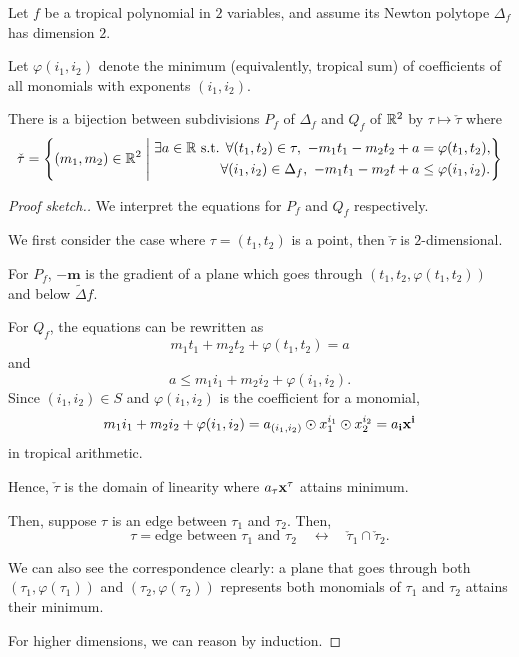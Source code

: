 \documentclass[../../main.tex]{subfiles}
\begin{document}
\begin{prop}
    Let $f$ be a tropical polynomial in $2$ variables, and assume its Newton polytope $\Delta_f$ has dimension $2$.

    Let $\varphi(i_1,i_2)$ denote the minimum (equivalently, tropical sum) of coefficients of all monomials with exponents $(i_1,i_2)$.
    
    There is a bijection between subdivisions $P_f$ of $\Delta_f$ and $Q_f$ of $\mathbb{R}^2$ by $\tau \mapsto \check\tau$ where 
    \[
    \check\tau = \left\{(m_1,m_2) \in \mathbb{R}^2 \Biggm|
    \begin{aligned}
        \exists a \in \mathbb{R} \text{ s.t. } 
        \forall (t_1,t_2) \in \tau,~-m_1t_1-m_2t_2+a & =\varphi(t_1,t_2), \\
        \forall (i_1,i_2) \in \Delta_f,~-m_1t_1-m_2t+a &\le \varphi(i_1,i_2).
    \end{aligned}
    \right\}
    \]
\end{prop}

\begin{proof}[Proof sketch.]
    We interpret the equations for $P_f$ and $Q_f$ respectively.

    We first consider the case where $\tau=(t_1,t_2)$ is a point, then $\check\tau$ is $2$-dimensional.
    
    For $P_f$, $-\mathbf m$ is the gradient of a plane which goes through $(t_1,t_2,\varphi(t_1,t_2))$ and below $\tilde\Delta f.$ 

    For $Q_f$, the equations can be rewritten as
    \[m_1t_1+m_2t_2+\varphi(t_1,t_2)=a\]
    and
    \[a \le m_1i_1+m_2i_2+\varphi(i_1,i_2).\]
    Since $(i_1,i_2) \in S$ and $\varphi(i_1,i_2)$ is the coefficient for a monomial,
    \[m_1i_1+m_2i_2+\varphi(i_1,i_2)=a_{(i_1,i_2)}\odot x_1^{i_1}\odot x_2^{i_2}=a_{\mathbf{i}} \mathbf{x}^{\mathbf{i}}\]
    in tropical arithmetic.

    Hence, $\check\tau$ is the domain of linearity where $a_\tau\mathbf{x}^\tau$ attains minimum. 

    Then, suppose $\tau$ is an edge between $\tau_1$ and $\tau_2$. Then,
    \[\tau=\text{edge between } \tau_1\text{ and }\tau_2 \quad \longleftrightarrow \quad \check \tau_1\cap \check\tau_2.\]

    We can also see the correspondence clearly: a plane that goes through both $(\tau_1,\varphi(\tau_1))$ and $(\tau_2,\varphi(\tau_2))$ represents both monomials of $\tau_1$ and $\tau_2$ attains their minimum. 

    For higher dimensions, we can reason by induction.
\end{proof}
\end{document}
